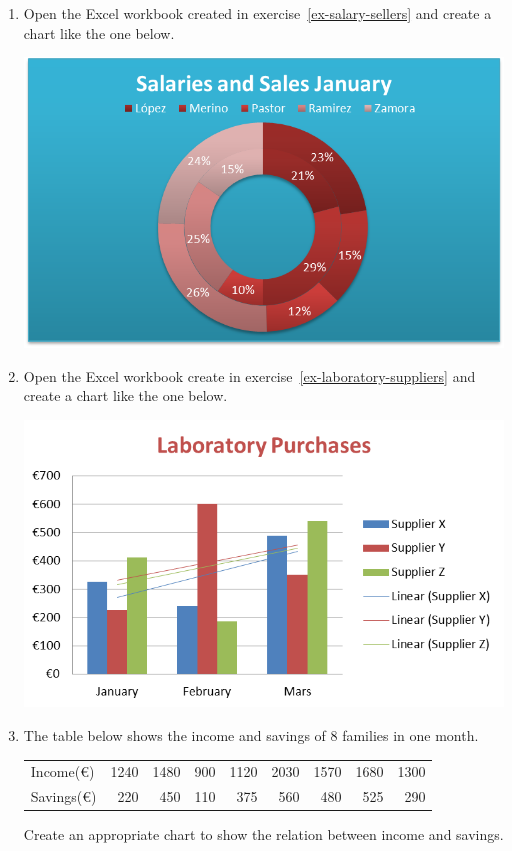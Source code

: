 \begin{enumerate}[leftmargin=*,resume]
\item Open the Excel workbook created in exercise~\ref{ex-salary-sellers} and create a chart like the one below.
\begin{center}
\includegraphics[scale=0.8]{img/salary-sellers}
\end{center}

\item Open the Excel workbook create in exercise~\ref{ex-laboratory-suppliers} and create a chart like the one below. 
\begin{center}
\includegraphics[scale=0.8]{img/laboratory-suppliers}
\end{center}

\item The table below shows the income and savings of 8 families in one month.
\begin{center}
\begin{tabular}{lrrrrrrrr}
\toprule
Income(€)  & 1240 & 1480 & 900 & 1120 & 2030 & 1570 & 1680 & 1300\\
Savings(€) &  220 &  450 & 110 &  375 &  560 &  480 &  525 &  290\\
\bottomrule
\end{tabular}
\end{center}
Create an appropriate chart to show the relation between income and savings. 
\end{enumerate}